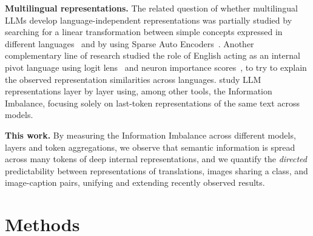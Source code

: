 \documentclass[10pt]{article} %
\begin{document}
\textbf{Multilingual representations.} 
The related question of whether multilingual LLMs develop language-independent representations was partially studied by searching for a linear transformation between simple concepts expressed in different languages~\citep{peng2024conceptspacealignmentmultilingual} and by using Sparse Auto Encoders~\citep{brinkmann2025largelanguagemodelsshare}. 
%
Another complementary line of research studied the role of English acting as an internal pivot language using logit lens~\citep{llama_english} and neuron importance scores~\citep{llm_multilingualism}, to try to explain the observed representation similarities across languages.
%
\citet{cheng2025emergence} study LLM representations layer by layer using, among other tools, the Information Imbalance, focusing solely on last-token representations of the same text across models. 

\textbf{This work.} 
By measuring the Information Imbalance across different models, layers and token aggregations, we observe that semantic information is spread across many tokens of deep internal representations, and we quantify the \emph{directed} predictability between representations of translations, images sharing a class, and image-caption pairs, unifying and extending recently observed results. 

\section{Methods}
\end{document}

